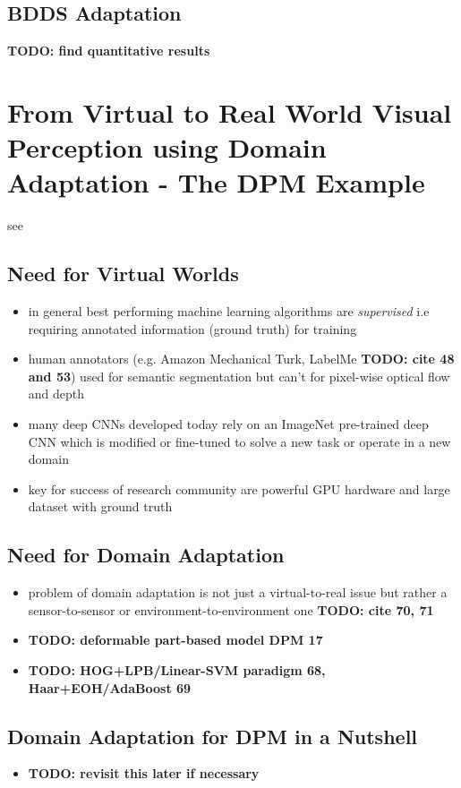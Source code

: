 \documentclass[]{article}
\newcommand{\todo}[1]{{\color{red}\bf{TODO: #1}}}
\begin{document}
\subsection{BDDS Adaptation}
\todo{find quantitative results}



\section{From Virtual to Real World Visual Perception using Domain Adaptation - The DPM Example}

see \cite{DBLP:journals/corr/LopezXGVR16}

\subsection{Need for Virtual Worlds}
\begin{itemize}
	\item in general best performing machine learning algorithms are \textit{supervised} i.e requiring annotated information (ground truth) for training
	\item human annotators (e.g. Amazon Mechanical Turk, LabelMe \todo{cite 48 and 53}) used for semantic segmentation but can't for pixel-wise optical flow and depth
	\item many deep CNNs developed today rely on an ImageNet pre-trained deep CNN which is modified or fine-tuned to solve a new task or operate in a new domain
	\item key for success of research community are powerful GPU hardware and large dataset with ground truth
\end{itemize}

\subsection{Need for Domain Adaptation}
\begin{itemize}
	\item problem of domain adaptation is not just a virtual-to-real issue but rather a sensor-to-sensor or environment-to-environment one \todo{cite 70, 71}
	\item \todo{deformable part-based model DPM 17}
	\item \todo{HOG+LPB/Linear-SVM paradigm 68, Haar+EOH/AdaBoost 69}
\end{itemize}

\subsection{Domain Adaptation for DPM in a Nutshell}
\begin{itemize}
	\item \todo{revisit this later if necessary}
\end{itemize}
\end{document}
